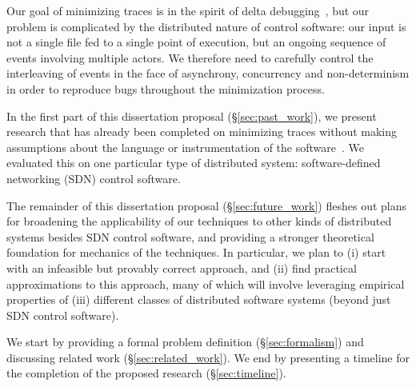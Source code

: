 Our goal of minimizing traces is in the spirit of
delta debugging~\cite{Zeller:1999:YMP:318773.318946}, but our problem is
complicated by the distributed nature of control software:
our input is not a single file fed to a single point of execution, but an ongoing
sequence of events involving
multiple actors. We therefore need to carefully
control the interleaving of events in the face of asynchrony, concurrency and non-determinism in
order to reproduce bugs throughout the minimization process.

In the first part of this dissertation proposal (\S\ref{sec:past_work}), we present research that has
already been completed on minimizing traces without making assumptions about the language
or instrumentation of the software~\cite{sts2014}. We evaluated this on one
particular type of distributed system: software-defined networking
(SDN) control software.


The remainder of this dissertation proposal (\S\ref{sec:future_work}) fleshes out plans for
broadening the applicability of our techniques to other kinds of distributed systems besides SDN control
software, and providing a stronger theoretical foundation for mechanics of the techniques.
In particular, we plan to (i) start with an infeasible but provably correct
approach, and (ii) find practical approximations to this approach, many of which will
involve leveraging empirical properties of (iii) different classes of distributed software
systems (beyond just SDN control software).

We start by providing a formal problem definition (\S\ref{sec:formalism}) and
discussing related work (\S\ref{sec:related_work}). We end by
presenting a timeline for the completion of the proposed research (\S\ref{sec:timeline}).
